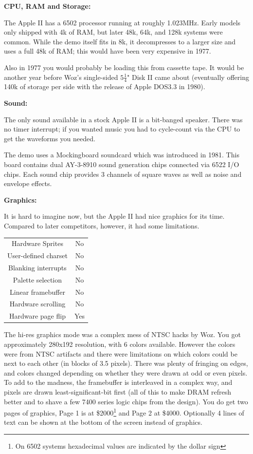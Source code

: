 \documentclass[twocolumn]{article}
\begin{document}
\vspace{1ex}
\noindent
{\bf CPU, RAM and Storage:}

The Apple II has a 6502 processor running at roughly 1.023MHz.
Early models only shipped with 4k of RAM, but later 48k, 64k, and 128k
systems were common.
While the demo itself fits in 8k, it decompresses to a larger size and uses
a full 48k of RAM;
this would have been very expensive in 1977.

Also in 1977 you would probably be loading this from cassette tape.
It would be another year before Woz's single-sided
$5\frac{1}{4}$" Disk II came about (eventually offering 140k of
storage per side with the release of Apple DOS3.3 in 1980). 
	
\vspace{1ex}
\noindent
{\bf Sound:}

The only sound available in a stock Apple II is a bit-banged speaker.
There was no timer interrupt; if you wanted music you had to cycle-count
via the CPU to get the waveforms you needed.

The demo uses a Mockingboard soundcard which was introduced in 1981.
This board contains dual AY-3-8910 sound generation chips connected via
6522 I/O chips.
Each sound chip provides 3 channels of square waves as well as noise and
envelope effects.

\vspace{1ex}
\noindent
{\bf Graphics:}

It is hard to imagine now, but the Apple II had nice graphics for its time.
Compared to later competitors, however, it had some limitations.

\begin{center}
\begin{tabular}{|c|c|}
\hline
Hardware Sprites     &	No \\
User-defined charset &	No \\
Blanking interrupts  &	No \\
Palette selection    &	No \\
Linear framebuffer   &	No \\
Hardware scrolling   &	No \\
Hardware page flip   &	Yes \\
\hline
\end{tabular}
\end{center}

The hi-res graphics mode was a complex mess of NTSC hacks by Woz.
You got approximately 280x192 resolution, with 6 colors available.
However the colors were from NTSC artifacts and there were limitations 
on which colors could be next to each other (in blocks of 3.5 pixels).
There was plenty of fringing on edges, and colors changed depending on
whether they were drawn at odd or even pixels.
To add to the madness, the framebuffer is interleaved in a complex way,
and pixels are drawn least-significant-bit first (all of this to make
DRAM refresh better and to shave a few 7400 series logic chips from the design).
You do get two pages of graphics, Page 1 is at
\$2000\footnote{On 6502 systems hexadecimal values are 
indicated by the dollar sign}
and Page 2 at \$4000.
Optionally 4 lines of text can be shown at the bottom of the
screen instead of graphics.
\end{document}
